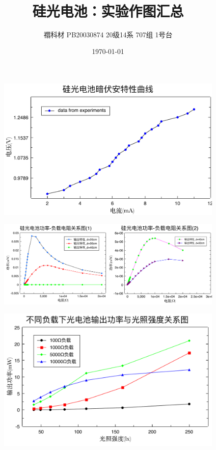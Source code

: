 \documentclass[UTF8]{ctexart}
\title{硅光电池：实验作图汇总}
\author{禤科材 PB20030874 20级14系 707组 1号台}
\date{\today}
\begin{document}
    \maketitle

    \begin{figure}[ht]
        \centering 
        \includegraphics[width=13cm]{伏安特性.pdf}
    \end{figure}

    \begin{figure}[ht]
        \centering 
        \includegraphics[width=13cm]{输出特性.pdf}
    \end{figure}
    \begin{figure}[ht]
        \centering 
        \includegraphics[width=13cm]{负载-光照强度 二维.pdf}
    \end{figure}
    
\end{document}

